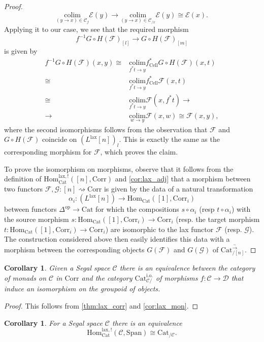 \documentclass[a4paper, reqno]{amsart}
\newtheorem{cor}[theorem]{Corollary}
\theoremstyle{definition}
\newcommand\cC{\mathscr C}
\newcommand\cD{\mathscr D}
\newcommand\cE{\mathscr E}
\newcommand\cF{\mathscr F}
\newcommand\cG{\mathscr G}
\newcommand\mor{\mathrm{Hom}}
\newcommand\op{\mathrm{op}}
\newcommand\cat{\mathrm{Cat}}
\newcommand\spanc{\mathrm{Span}}
\newcommand\colim{\mathrm{colim}}
\newcommand\corr{\mathrm{Corr}}
\newcommand\cell{\mathrm{Cell}}
\newcommand\bo{\mathrm{i.o.}}
\newcommand\lax{\mathrm{lax}}
\newcommand\wrr{{\overset{\sim}{\rightarrow}}}
\begin{document}
\begin{proof}
\[\underset{(y\rightarrow x)\in\cC_f}{\colim}\cE(y)\rightarrow\underset{(y\rightarrow x)\in\cC_{/x}}{\colim}\cE(y)\cong \cE(x).\]
Applying it to our case, we see that the required morphism 
\[f^{-1}G\circ H(\cF)_{[l]}\rightarrow G\circ H(\cF)_{[m]}\]
is given by
\begin{align*}
    f^{-1}G\circ H(\cF)(x,y)\cong& \underset{f^*t\rightarrow y}{\colim}f^*_\cell G\circ H(\cF)(x,t)\\
    \cong& \underset{f^*t\rightarrow y}{\colim}f^*_\cell\cF(x,t)\\
    \cong&\underset{f^*t\rightarrow y}{\colim}\cF(x,f^*t) \rightarrow\\
    \rightarrow&\underset{w\rightarrow y}{\colim}\cF(x,w)\cong\cF(x,y),
\end{align*}
where the second isomorphisms follows from the observation that $\cF$ and $G\circ H(\cF)$ coincide on $(L^\lax[n])_l$. This is exactly the same as the corresponding morphism for $\cF$, which proves the claim.\par
To prove the isomorphism on morphisms, observe that it follows from the definition of $\mor^{\lax,!}_\cat([n],\corr)$ and \cref{cor:lax_adj} that a morphism between two functors $\cF,\cG:[n]\rightsquigarrow\corr$ is given by the data of a natural transformation
\[\alpha_i:(L^\lax[n])\rightarrow\mor_\cat([1],\corr_i)\]
between functors $\Delta^\op\rightarrow\cat$ for which the compositions $s\circ \alpha_i$ (resp $t\circ \alpha_i$)  with the source morphism $s:\mor_\cat([1],\corr_i)\rightarrow\corr_i$ (resp. the target morphism $t:\mor_\cat([1],\corr_i)\rightarrow\corr_i$) are isomorphic to the lax functor $\cF$ (resp. $\cG$). The construction considered above then easily identifies this data with a morphism between the corresponding objects $G(\cF)$ and $G(\cG)$ of $\cat^\wrr_{/[n]}$.
\end{proof}
\begin{cor}\label{cor:monad}
Given a Segal space $\cC$ there is an equivalence between the category of monads on $\cC$ in $\corr$ and the category $\cat^{\bo}_{\cC/}$ of morphisms $f:\cC\rightarrow\cD$ that induce an isomorphism on the groupoid of objects. \par
\end{cor}
\begin{proof}
This follows from \cref{thm:lax_corr} and \cref{cor:lax_mon}.
\end{proof}
\begin{cor}\label{cor:lax_span}
For a Segal space $\cC$ there is an equivalence
\[\mor_\cat^{\lax,!}(\cC,\spanc)\cong\cat_{/\cC}.\]
\end{cor}
\end{document}
